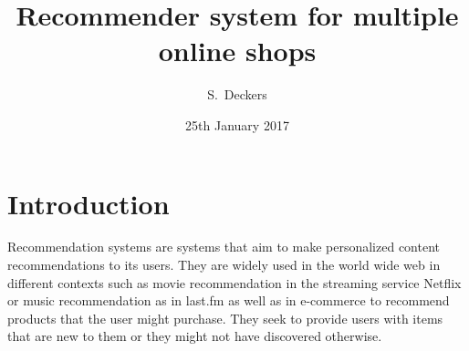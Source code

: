 \documentclass[10pt]{reportMaster}
\title{Recommender system for multiple online shops}
\author{S.\ Deckers}
\date{25th January 2017}
\begin{document}
\maketitle

\tableofcontents

\listoffigures
\listoftables
\listofalgorithms

\chapter{Introduction}
Recommendation systems are systems that aim to make personalized content recommendations to its users.
They are widely used in the world wide web in different contexts such as movie recommendation in the streaming service Netflix or music recommendation as in last.fm as well as in e-commerce to recommend products that the user might purchase.
They seek to provide users with items that are new to them or they might not have discovered otherwise.
\end{document}
